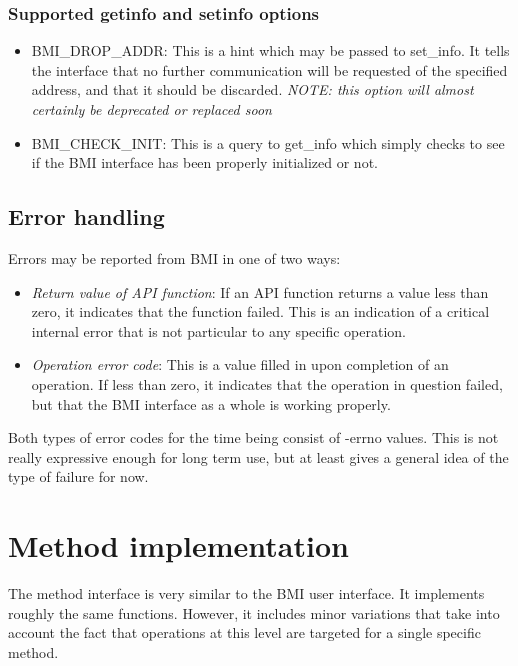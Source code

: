 \documentclass[11pt]{article}
\begin{document}
\subsubsection{Supported getinfo and setinfo options}

\begin{itemize}
\item BMI\_DROP\_ADDR: This is a hint which may be passed to
set\_info.  It tells the interface that no further communication
will be requested of the specified address, and that it should be
discarded.  \emph{NOTE: this option will almost certainly be
deprecated or replaced soon}
\item BMI\_CHECK\_INIT: This is a query to get\_info which simply
checks to see if the BMI interface has been properly initialized
or not.
\end{itemize}

\subsection{Error handling}

Errors may be reported from BMI in one of two ways:

\begin{itemize}
\item \emph{Return value of API function}:  If an API function
returns a value less than zero, it indicates that the function
failed.  This is an indication of a critical internal error that
is not particular to any specific operation.
\item \emph{Operation error code}:  This is a value filled in upon
completion of an operation.  If less than zero, it indicates that
the operation in question failed, but that the BMI interface as a
whole is working properly.
\end{itemize}

Both types of error codes for the time being consist of -errno
values.  This is not really expressive enough for long term use,
but at least gives a general idea of the type of failure for now.

\section{Method implementation}
\label{sec:methguide}

The method interface is very similar to the BMI user interface.
It implements roughly the same functions. However, it includes minor
variations that take into account the fact that operations at this level
are targeted for a single specific method.
\end{document}
